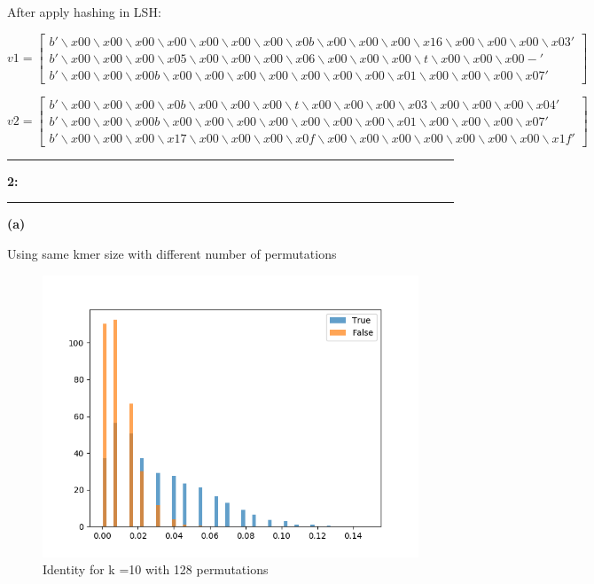 \documentclass[11pt]{article}
\newcommand\question[2]{\vspace{.25in}\hrule\textbf{#1: #2}\vspace{.5em}\hrule\vspace{.10in}}
\renewcommand\part[1]{\vspace{.10in}\textbf{(#1)}}
\begin{document}
After apply hashing in LSH:

$ v1 = \begin{bmatrix}
b' \backslash x00\backslash x00\backslash x00\backslash x00\backslash x00\backslash x00\backslash x00\backslash x0b\backslash x00\backslash x00\backslash x00\backslash x16\backslash x00\backslash x00\backslash x00\backslash x03'\\ b'\backslash x00\backslash x00\backslash x00\backslash x05\backslash x00\backslash x00\backslash x00\backslash x06\backslash x00\backslash x00\backslash x00\backslash t\backslash x00\backslash x00\backslash x00-'\\ b'\backslash x00\backslash x00\backslash x00b\backslash x00\backslash x00\backslash x00\backslash x00\backslash x00\backslash x00\backslash x00\backslash x01\backslash x00\backslash x00\backslash x00\backslash x07' 
\end{bmatrix} $

$ v2 = \begin{bmatrix}
b'\backslash x00\backslash x00\backslash x00\backslash x0b\backslash x00\backslash x00\backslash x00\backslash t\backslash x00\backslash x00\backslash x00\backslash x03\backslash x00\backslash x00\backslash x00\backslash x04'\\ b'\backslash x00\backslash x00\backslash x00b\backslash x00\backslash x00\backslash x00\backslash x00\backslash x00\backslash x00\backslash x00\backslash x01\backslash x00\backslash x00\backslash x00\backslash x07'\\ b'\backslash x00\backslash x00\backslash x00\backslash x17\backslash x00\backslash x00\backslash x00\backslash x0f\backslash x00\backslash x00\backslash x00\backslash x00\backslash x00\backslash x00\backslash x00\backslash x1f' 
\end{bmatrix} $
\question{2}{}


\part{a}

Using same kmer size with different number of permutations

\begin{figure}[H]
	\centering
	\includegraphics[width = .8\textwidth]{Ecoli_30x_overlap_5000_1000_cutoff_identity_k_10_perm_128.png}
	\caption{Identity for k =10 with 128 permutations}
	\label{fig1}
\end{figure}
\end{document}
